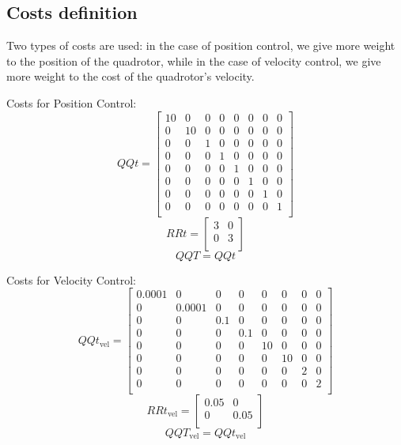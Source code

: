 \subsection{Costs definition}
Two types of costs are used: in the case of position control, we give more weight to the position of the quadrotor, while in the case of velocity control, we give more weight to the cost of the quadrotor's velocity. \vspace{8pt}

Costs for Position Control:
\[
QQt = \begin{bmatrix}
10 & 0 & 0 & 0 & 0 & 0 & 0 & 0 \\
0 & 10 & 0 & 0 & 0 & 0 & 0 & 0 \\
0 & 0 & 1 & 0 & 0 & 0 & 0 & 0 \\
0 & 0 & 0 & 1 & 0 & 0 & 0 & 0 \\
0 & 0 & 0 & 0 & 1 & 0 & 0 & 0 \\
0 & 0 & 0 & 0 & 0 & 1 & 0 & 0 \\
0 & 0 & 0 & 0 & 0 & 0 & 1 & 0 \\
0 & 0 & 0 & 0 & 0 & 0 & 0 & 1 \\
\end{bmatrix}
\]
\[
RRt = \begin{bmatrix}
3 & 0 \\
0 & 3 \\
\end{bmatrix}
\]
\vspace{8pt}
\[
QQT = QQt
\]

Costs for Velocity Control:
\[
QQt_{\text{vel}} = \begin{bmatrix}
0.0001 & 0 & 0 & 0 & 0 & 0 & 0 & 0 \\
0 & 0.0001 & 0 & 0 & 0 & 0 & 0 & 0 \\
0 & 0 & 0.1 & 0 & 0 & 0 & 0 & 0 \\
0 & 0 & 0 & 0.1 & 0 & 0 & 0 & 0 \\
0 & 0 & 0 & 0 & 10 & 0 & 0 & 0 \\
0 & 0 & 0 & 0 & 0 & 10 & 0 & 0 \\
0 & 0 & 0 & 0 & 0 & 0 & 2 & 0 \\
0 & 0 & 0 & 0 & 0 & 0 & 0 & 2 \\
\end{bmatrix}
\]
\vspace{8pt}
\[
RRt_{\text{vel}} = \begin{bmatrix}
0.05 & 0 \\
0 & 0.05 \\
\end{bmatrix}
\]
\vspace{8pt}
\[
QQT_{\text{vel}} = QQt_{\text{vel}}
\]

